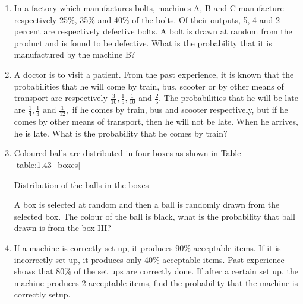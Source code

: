 \begin{enumerate}[label=\thesection.\arabic*.,ref=\thesection.\theenumi]
\item In a factory which manufactures bolts, machines A, B and C manufacture respectively 25$\%$, 35$\%$ and 40$\%$ of the bolts. Of their outputs, 5, 4 and 2 percent are respectively defective bolts. A bolt is drawn at random from the product and is found to be defective. What is the probability that it is manufactured by the machine B?\\
\solution


\item A doctor is to visit a patient. From the past experience, it is known that the probabilities that he will come by train, bus, scooter or by other means of transport are respectively $\frac{3}{10},\frac{1}{5},\frac{1}{10}$ and $\frac{2}{5}.$ The probabilities that he will be late are $\frac{1}{4},\frac{1}{3}$ and $\frac{1}{12},$ if he comes by train, bus and scooter respectively, but if he comes by other means of transport, then he will not be late. When he arrives, he is late. What is the probability that he comes by train?\\
\solution


\item Coloured balls are distributed in four boxes as shown in Table \ref{table:1.43_boxes}

\begin{table}[ht!]
\centering

\caption{Distribution of the balls in the boxes}
\label{table:1.43_boxes}
\end{table}
A box is selected at random and then a ball is randomly drawn from the selected box. The colour of the ball is black, what is the probability that ball drawn is from the box III?
\\
\solution


\item If a machine is correctly set up, it produces 90$\%$ acceptable items. If it is
incorrectly set up, it produces only 40$\%$ acceptable items. Past experience shows that
80$\%$ of the set ups are correctly done. If after a certain set up, the machine produces 2 acceptable items, find the probability that the machine is correctly setup.
\\
\solution



\end{enumerate}
